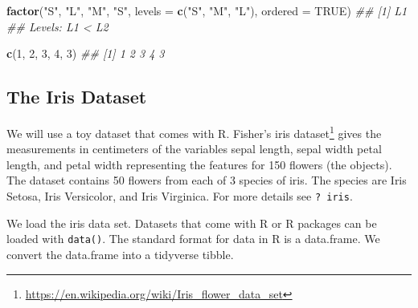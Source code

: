 \documentclass[
  notitlepage]{book}
\newenvironment{Shaded}{\begin{snugshade}}{\end{snugshade}}
\newcommand{\CommentTok}[1]{\textcolor[rgb]{0.56,0.35,0.01}{\textit{#1}}}
\newcommand{\DataTypeTok}[1]{\textcolor[rgb]{0.13,0.29,0.53}{#1}}
\newcommand{\DecValTok}[1]{\textcolor[rgb]{0.00,0.00,0.81}{#1}}
\newcommand{\KeywordTok}[1]{\textcolor[rgb]{0.13,0.29,0.53}{\textbf{#1}}}
\newcommand{\NormalTok}[1]{#1}
\newcommand{\OtherTok}[1]{\textcolor[rgb]{0.56,0.35,0.01}{#1}}
\newcommand{\StringTok}[1]{\textcolor[rgb]{0.31,0.60,0.02}{#1}}
\DeclareRobustCommand{\href}[2]{#2\footnote{\url{#1}}}
\begin{document}
\begin{Shaded}
\begin{Highlighting}[]
\KeywordTok{factor}\NormalTok{(}\StringTok{"S"}\NormalTok{, }\StringTok{"L"}\NormalTok{, }\StringTok{"M"}\NormalTok{, }\StringTok{"S"}\NormalTok{, }
       \DataTypeTok{levels =} \KeywordTok{c}\NormalTok{(}\StringTok{"S"}\NormalTok{, }\StringTok{"M"}\NormalTok{, }\StringTok{"L"}\NormalTok{), }
       \DataTypeTok{ordered =} \OtherTok{TRUE}\NormalTok{)}
\CommentTok{\#\# [1] L1}
\CommentTok{\#\# Levels: L1 \textless{} L2}
\end{Highlighting}
\end{Shaded}

\begin{Shaded}
\begin{Highlighting}[]
\KeywordTok{c}\NormalTok{(}\DecValTok{1}\NormalTok{, }\DecValTok{2}\NormalTok{, }\DecValTok{3}\NormalTok{, }\DecValTok{4}\NormalTok{, }\DecValTok{3}\NormalTok{)}
\CommentTok{\#\# [1] 1 2 3 4 3}
\end{Highlighting}
\end{Shaded}

\hypertarget{the-iris-dataset}{%
\subsection{The Iris Dataset}\label{the-iris-dataset}}

We will use a toy dataset that comes with R. \href{https://en.wikipedia.org/wiki/Iris_flower_data_set}{Fisher's iris
dataset} gives the
measurements in centimeters of the variables sepal length, sepal width
petal length, and petal width representing the features for 150 flowers (the objects).
The dataset contains 50
flowers from each of 3 species of iris. The species are Iris Setosa,
Iris Versicolor, and Iris Virginica. For more details see \texttt{?\ iris}.

We load the iris data set. Datasets that come with R or R packages can
be loaded with \texttt{data()}. The standard format for data in R is a
data.frame. We convert the data.frame into a tidyverse tibble.
\end{document}
